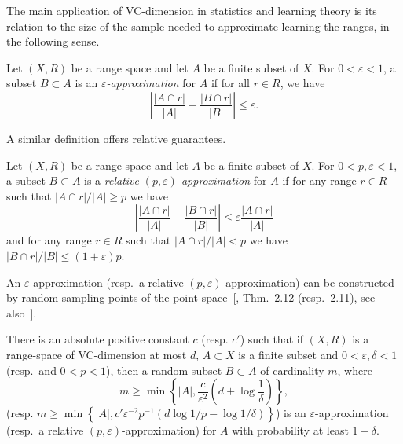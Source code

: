 The main application of VC-dimension in statistics and learning theory is its
relation to the size of the sample needed to approximate learning the ranges, in
the following sense.

\begin{definition}\label{defn:eapprox}
  Let $(X,R)$ be a range space and let $A$
  be a finite subset of $X$. For $0<\varepsilon<1$, a subset $B\subset A$ is an
  $\varepsilon${\em-approximation} for $A$ if for all $r\in R$, we have
      \begin{equation}\label{eq:defeapprox}
	\left|\frac{|A\cap r|}{|A|}-\frac{|B\cap r|}{|B|}\right| \leq
	\varepsilon.
      \end{equation}
\end{definition}

A similar definition offers relative guarantees.
\begin{definition}\label{defn:releapprox}
  Let $(X,R)$ be a range space and let $A$
  be a finite subset of $X$. For $0<p,\varepsilon<1$, a subset $B\subset A$ is a
  \emph{relative} $(p,\varepsilon)$\emph{-approximation} for $A$ if for any
  range $r\in R$ such that $|A\cap r|/|A|\geq p$ we have 
  \[ \left|\frac{|A\cap r|}{|A|}-\frac{|B\cap r|}{|B|}\right| \leq
  \varepsilon\frac{|A\cap r|}{|A|}
  \]
  and for any range $r\in R$ such that $|A\cap r|/|A|< p$ we have $|B\cap
	r|/|B| \leq (1+\varepsilon)p$.
\end{definition}

An $\varepsilon$-approximation (resp.~a relative
$(p,\varepsilon)$-approximation) can be constructed by random sampling points of
the point space~[\cite{HarPS11}, Thm.~2.12 (resp.~2.11), see
also~\citep{LiLS01}].

\begin{theorem}\label{thm:eapprox}
  There is an absolute positive constant $c$ (resp. $c'$)
  such that if $(X,R)$ is a range-space of VC-dimension at most $d$, $A\subset
  X$ is a finite subset and $0<\varepsilon,\delta<1$ (resp.~and $0<p<1$), then a
  random subset $B\subset A$ of cardinality $m$, where
  \begin{equation}\label{eq:eapprox}
    m\ge\min\left\{|A|,\frac{c}{\varepsilon^2}\left(d+\log\frac{1}{\delta}\right)\right\},
  \end{equation}
  (resp.
  $m\ge\min\left\{|A|,c'\varepsilon^{-2}p^{-1}\left(d\log1/p-\log1/\delta\right)\right\}$)
  is an $\varepsilon$-approximation (resp.~a relative
  $(p,\varepsilon)$-approximation) for $A$ with probability at least $1-\delta$.
\end{theorem}

